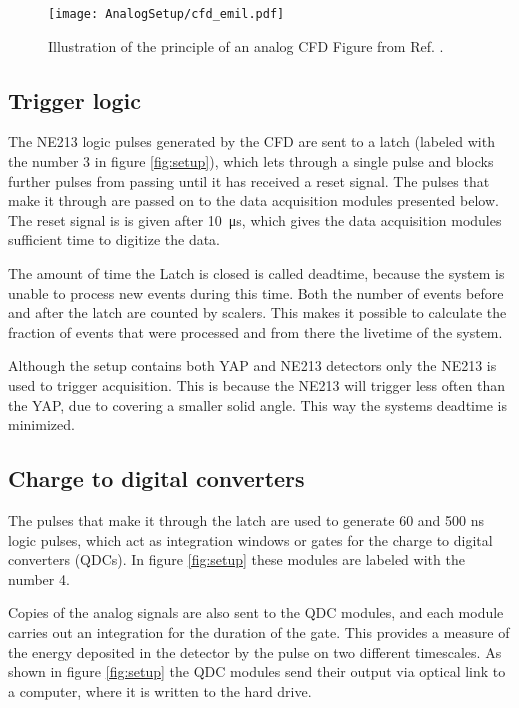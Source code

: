 \documentclass[main.tex]{subfiles}
\begin{document}
\begin{figure}[h]
    \centering
        \texttt{[image: AnalogSetup/cfd\_emil.pdf]}
        \caption[CFD trigger principle]{Illustration of the principle of an analog CFD Figure from Ref. \cite{rofors}.}
    \label{fig:cfd}
\end{figure}



\subsection{Trigger logic}
The NE213 logic pulses generated by the CFD are sent to a latch (labeled with the number 3 in figure \ref{fig:setup}), which lets through a single pulse and blocks further pulses from passing until it has received a reset signal. The pulses that make it through are passed on to the data acquisition modules presented below. The reset signal is is given after \SI{10}{\micro\second}, which gives the data acquisition modules sufficient time to digitize the data.

The amount of time the Latch is closed is called deadtime, because the system is unable to process new events during this time. Both the number of events before and after the latch are counted by scalers. This makes it possible to calculate the fraction of events that were processed and from there the livetime of the system.

Although the setup contains both YAP and NE213 detectors only the NE213 is used to trigger acquisition. This is because the NE213 will trigger less often than the YAP, due to covering a smaller solid angle. This way the systems deadtime is minimized.

\subsection{Charge to digital converters}
The pulses that make it through the latch are used to generate 60 and 500 ns logic pulses, which act as integration windows or gates for the charge to digital converters (QDCs). In figure \ref{fig:setup} these modules are labeled with the number 4.

Copies of the analog signals are also sent to the QDC modules, and each module carries out an integration for the duration of the gate. This provides a measure of the energy deposited in the detector by the pulse on two different timescales. As shown in figure \ref{fig:setup} the QDC modules send their output via optical link to a computer, where it is written to the hard drive.
\end{document}
